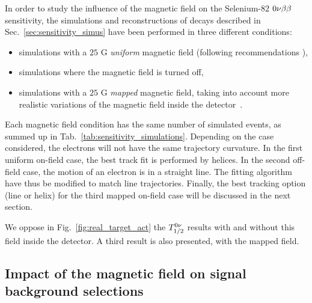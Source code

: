 In order to study the influence of the magnetic field on the Selenium-$82$ $0\nu\beta\beta$ sensitivity, the simulations and reconstructions of decays described in Sec.~\ref{sec:sensitivity_simus} have been performed in three different conditions:
\begin{itemize}
\item simulations with a $25$ G \emph{uniform} magnetic field (following recommendations \cite{CalvezThesis}),
\item simulations where the magnetic field is turned off,
\item simulations with a $25$ G \emph{mapped} magnetic field, taking into account more realistic variations of the magnetic field inside the detector~\cite{docdb:map_magnetic_field2015}.
\end{itemize}
Each magnetic field condition has the same number of simulated events, as summed up in Tab.~\ref{tab:sensitivity_simulations}.
Depending on the case considered, the electrons will not have the same trajectory curvature.
In the first uniform on-field case, the best track fit is performed by helices.
In the second off-field case, the motion of an electron is in a straight line.
The fitting algorithm have thus be modified to match line trajectories.
Finally, the best tracking option (line or helix) for the third mapped on-field case will be discussed in the next section.

We oppose in Fig.~\ref{fig:real_target_act} the $T_{1/2}^{0\nu}$ results with and without this field inside the detector.
A third result is also presented, with the mapped field.

\subsection{Impact of the magnetic field on signal background selections}

